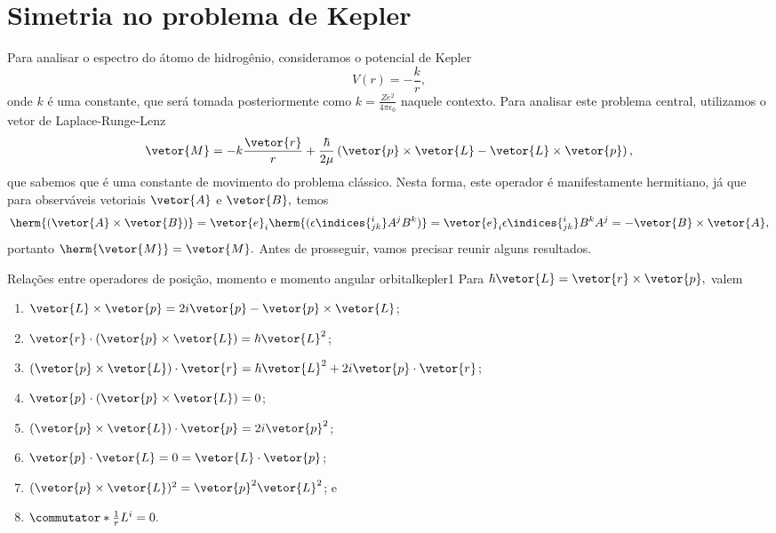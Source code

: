 \section{Simetria no problema de Kepler}
Para analisar o espectro do átomo de hidrogênio, consideramos o potencial de Kepler
\begin{equation*}
   V(r) = -\frac{k}{r},
\end{equation*}
onde \(k\) é uma constante, que será tomada posteriormente como \(k = \frac{Ze^2}{4\pi \epsilon_0}\) naquele contexto. Para analisar este problema central, utilizamos o vetor de Laplace-Runge-Lenz
\begin{equation*}
   \vetor{M} = -k \frac{\vetor{r}}{r} + \frac{\hbar}{2\mu}\left(\vetor{p}\times\vetor{L} - \vetor{L}\times\vetor{p}\right),
\end{equation*}
que sabemos que é uma constante de movimento do problema clássico. Nesta forma, este operador é manifestamente hermitiano, já que para observáveis vetoriais \(\vetor{A}\) e \(\vetor{B},\) temos
\begin{equation*}
   \herm{(\vetor{A}\times\vetor{B})} = \vetor{e}_i\herm{(\epsilon\indices{^i_{jk}}A^j B^k)} = \vetor{e}_i  \epsilon\indices{^i_{jk}} B^k A^j = - \vetor{B} \times \vetor{A},
\end{equation*}
portanto \(\herm{\vetor{M}} = \vetor{M}.\) Antes de prosseguir, vamos precisar reunir alguns resultados.
\begin{lemma}{Relações entre operadores de posição, momento e momento angular orbital}{kepler1}
   Para \(\hbar\vetor{L} = \vetor{r} \times \vetor{p},\) valem
   \begin{enumerate}[label=(\alph*)]
      \item \(\vetor{L}\times \vetor{p} = 2i\vetor{p} -\vetor{p}\times \vetor{L}\);
      \item \(\vetor{r} \cdot (\vetor{p} \times \vetor{L}) = \hbar \vetor{L}^2\);
      \item \((\vetor{p} \times \vetor{L}) \cdot \vetor{r} = \hbar \vetor{L}^2 + 2i \vetor{p} \cdot \vetor{r}\);
      \item \(\vetor{p}\cdot(\vetor{p}\times\vetor{L}) = 0\);
      \item \((\vetor{p}\times \vetor{L})\cdot \vetor{p} = 2i \vetor{p}^2\);
      \item \(\vetor{p} \cdot \vetor{L} = 0 = \vetor{L}\cdot\vetor{p}\); 
      \item \((\vetor{p}\times\vetor{L})^2 = \vetor{p}^2 \vetor{L}^2\); e
      \item \(\commutator*{\frac{1}{r}}{L^i} = 0.\)
   \end{enumerate}
\end{lemma}
